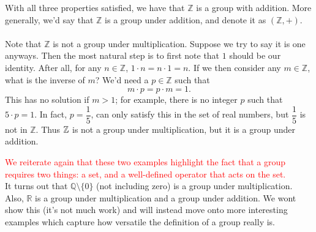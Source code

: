 With all three properties satisfied, we have that $\mathbb{Z}$ is a
group with addition. More generally, we'd say that $\mathbb{Z}$ is a
group under addition, and denote it as $(\mathbb{Z}, +)$.
\\
\\
{\color{Plum} 
Note that $\mathbb{Z}$ is not a group under multiplication. Suppose we
try to say it is one anyways. Then the most natural step is to first note that $1$
should be our identity. After all, for any $n \in \mathbb{Z}$, $1
\cdot n = n \cdot 1 = n$. If we then consider any $m \in \mathbb{Z}$,
what is the inverse of $m$? We'd need a $p \in
\mathbb{Z}$ such that 
\[
    m\cdot p = p\cdot m = 1.
\]
This has no solution if $m > 1$; for example, there is no integer $p$ 
such that $5 \cdot p = 1$. In fact, $p = \dfrac{1}{5}$, can only
satisfy this in the set of real numbers, but $\dfrac{1}{5}$ is not
in $\mathbb{Z}$. Thus $\mathbb{Z}$ is not a group under multiplication, but
it is a group under addition.
}

\textcolor{red}{We reiterate again that these two examples highlight the fact that a
group requires two things: a set, and a well-defined operator that
acts on the set.}
\\

It turns out that $\mathbb{Q}\setminus\{0\}$ (not including zero) is a group under
multiplication. Also, $\mathbb{R}$ is a group under multiplication and
a group under addition. We wont show this (it's not much work) and
will instead move onto more interesting examples which capture how
versatile the definition of a group really is. 

